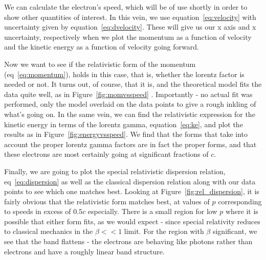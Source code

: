\documentclass[reprint, nobibnotes, amssymb, amsmath, amsfonts, physics, mathtools, mathrsfs, floatfix]{revtex4-1}
\begin{document}
       We can calculate the electron's speed, which will be of use shortly in order to show other quantities of interest.  In this vein, we use equation~\ref{eq:velocity} with uncertainty given by equation~\ref{eq:dvelocity}.  These will give us our x axis and x uncertainty, respectively when we plot the momentum as a function of velocity and the kinetic energy as a function of velocity going forward.

       \hspace{.25cm}

       Now we want to see if the relativistic form of the momentum (eq~\ref{eq:momentum}), holds in this case, that is, whether the lorentz factor is needed or not.  It turns out, of course, that it is, and the theoretical model fits the data quite well, as in Figure~\ref{fig:momvsspeed} .  Importantly - no actual fit was performed, only the model overlaid on the data points to give a rough inkling of what's going on.  In the same vein, we can find the relativistic expression for the kinetic energy in terms of the lorentz gamma, equation~\ref{eq:ke}, and plot the results as in Figure~\ref{fig:energyvsspeed}.  We find that the forms that take into account the proper lorentz gamma factors are in fact the proper forms, and that these electrons are most certainly going at significant fractions of $c$.

       \hspace{.25cm}

       Finally, we are going to plot the special relativistic dispersion relation, eq~\ref{eq:dispersion} as well as the classical dispersion relation along with our data points to see which one matches best.  Looking at Figure~\ref{fig:rel_dispersion}, it is fairly obvious that the relativistic form matches best, at values of $p$ corresponding to speeds in excess of $0.5c$ especially.  There is a small region for low $p$ where it is possible that either form fits, as we would expect - since special relativity reduces to classical mechanics in the $\beta << 1$ limit.  For the region with $\beta$ significant, we see that the band flattens - the electrons are behaving like photons rather than electrons and have a roughly linear band structure.

       \hspace{.25cm}
\end{document}
